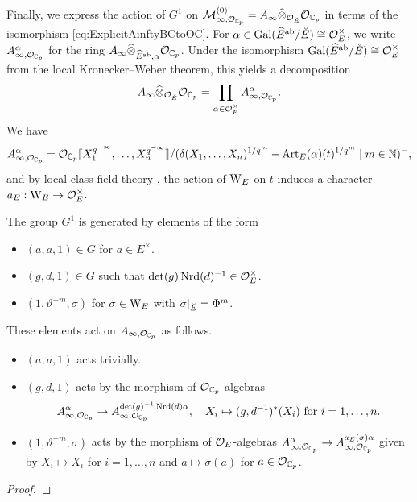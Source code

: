 \documentclass[../main.tex]{subfiles}
\begin{document}
Finally, we express the action of $G^1$ on $\mathcal{M}_{\infty, \mathcal{O}_{\mathbb{C}_p}}^{(0)} =
A_\infty \widehat \otimes_{\mathcal{O}_{\breve {E}}} \mathcal{O}_{\mathbb{C}_p}$ in terms of the isomorphism
\eqref{eq:ExplicitAinftyBCtoOC}.
For $\alpha \in \operatorname{Gal}(\widehat E^{\mathrm{ab}} / {\breve {E}}) \cong \mathcal{O}_E^\times$, we write
$A_{\infty, \mathcal{O}_{\mathbb{C}_p}}^{\alpha}$ for the ring
$A_\infty \widehat \otimes_{\widehat E^{\mathrm{ab}}, \alpha} \mathcal{O}_{\mathbb{C}_p}$.
Under the isomorphism $\operatorname{Gal}(\widehat E^{\mathrm{ab}} / {\breve {E}}) \cong \mathcal{O}_E^\times$ from 
the local Kronecker--Weber theorem, this yields a decomposition
\begin{equation*}
  A_{\infty} \widehat \otimes_{\mathcal{O}_{\breve {E}}} \mathcal{O}_{\mathbb{C}_p} = \prod_{\alpha \in \mathcal{O}_E^\times}
  A_{\infty, \mathcal{O}_{\mathbb{C}_p}}^{\alpha}.
\end{equation*}
We have 
\begin{equation*}
  A_{\infty, \mathcal{O}_{\mathbb{C}_p}}^{\alpha} = \mathcal{O}_{{\mathbb{C}_p}}\llbracket X_1^{q^{-\infty}}, \dots, 
  X_n^{q^{-\infty}} \rrbracket / (\delta(X_1, \dots, X_n)^{1/q^m} - \mathrm{Art}_E(\alpha)(t)^{1/q^m} 
  \mid m \in \mathbb{N})^-,
\end{equation*}
and by local class field theory , the action of $\mathrm W_E$ on
$t$ induces a character $a_E: \mathrm W_E \to \mathcal{O}_E^\times$. 


\begin{prop}\label{prop:ExplicitDescriptionOfActionOnAinfty}
  The group $G^1$ is generated by elements of the form
  \begin{itemize}
    \item $(a, a, 1) \in G$ for $a \in E^\times$.
    \item $(g, d, 1) \in G$ such that $\det(g) \operatorname{Nrd}(d)^{-1} \in \mathcal{O}_E^\times$.
    \item $(1, \vartheta^{-m}, \sigma)$ for $\sigma \in \mathrm W_E$ with
      $\sigma|_{{\breve {E}}} = \Phi^m$. 
  \end{itemize}
  These elements act on $A_{\infty, \mathcal{O}_{\mathbb{C}_p}}$ as follows.
  \begin{itemize}
    \item $(a,a,1)$ acts trivially.
    \item $(g,d,1)$ acts by the morphism of $\mathcal{O}_{\mathbb{C}_p}$-algebras
      $$A_{\infty, \mathcal{O}_{\mathbb{C}_p}}^\alpha \to A_{\infty, \mathcal{O}_{\mathbb{C}_p}}^{\det(g)^{-1} \operatorname{Nrd}(d) \alpha},
    \quad X_i \mapsto (g,d^{-1})^*(X_i) \ \text{for} \ i = 1, \dots,n.$$
    \item $(1, \vartheta^{-m}, \sigma)$ acts by the morphism of $\mathcal{O}_E$-algebras 
      $A_{\infty, \mathcal{O}_{\mathbb{C}_p}}^\alpha \to A_{\infty, \mathcal{O}_{\mathbb{C}_p}}^{a_E(\sigma)\alpha}$
      given by $X_i \mapsto X_i$ for $i = 1, \dots, n$ and $a \mapsto
      \sigma(a)$ for $a \in \mathcal{O}_{\mathbb{C}_p}$.
  \end{itemize}
\begin{proof}
\end{proof}
\end{prop}
\end{document}
